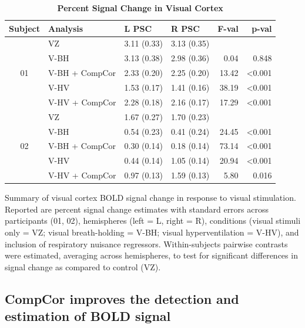 \documentclass[9pt]{NEU502b-fmri}
\begin{document}
\begin{table}
\begin{center}
\begin{tabular}{c l l l r r}
\toprule
{Subject} & Analysis & L PSC & R PSC & F-val & p-val \\
\midrule
\multirow{5}{*}{01} & VZ          & 3.11 (0.33) & 3.13 (0.35) &       & \\
                    & V-BH           & 3.13 (0.38) & 2.98 (0.36) & 0.04  & 0.848\\
                    & V-BH + CompCor & 2.33 (0.20) & 2.25 (0.20) & 13.42 & <0.001\\
                    & V-HV           & 1.53 (0.17) & 1.41 (0.16) & 38.19 & <0.001\\
                    & V-HV + CompCor & 2.28 (0.18) & 2.16 (0.17) & 17.29 & <0.001\\\cline{2-6}
\multirow{5}{*}{02} & VZ          & 1.67 (0.27) & 1.70 (0.23) &       & \\
                    & V-BH           & 0.54 (0.23) & 0.41 (0.24) & 24.45 & <0.001\\
                    & V-BH + CompCor & 0.30 (0.14) & 0.18 (0.14) & 73.14 & <0.001\\
                    & V-HV           & 0.44 (0.14) & 1.05 (0.14) & 20.94 & <0.001\\
                    & V-HV + CompCor & 0.97 (0.13) & 1.59 (0.13) & 5.80 & 0.016 \\
\bottomrule
\end{tabular}
\end{center}
\caption{\textbf{Percent Signal Change in Visual Cortex}}
\par Summary of visual cortex BOLD signal change in response to visual stimulation. Reported are percent signal change estimates with standard errors across participants (01, 02), hemispheres (left = L, right = R), conditions (visual stimuli only = VZ; visual breath-holding = V-BH;  visual hyperventilation = V-HV), and inclusion of respiratory nuisance regressors. Within-subjects pairwise contrasts were estimated, averaging across hemispheres, to test for significant differences in signal change as compared to control (VZ).
\end{table}

\subsection{CompCor improves the detection and estimation of BOLD signal}
\end{document}
